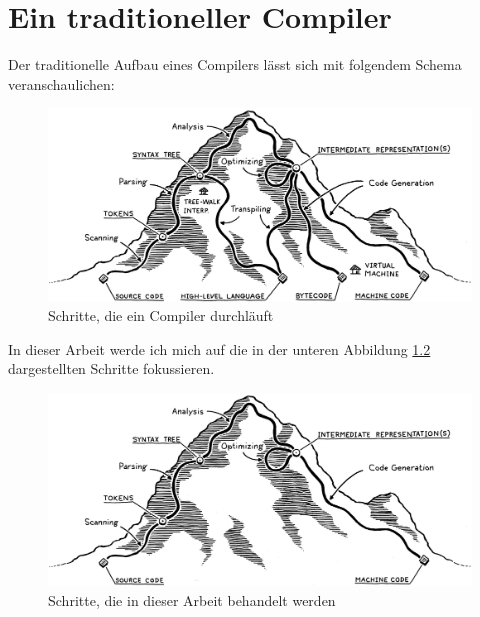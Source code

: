 \chapter{Ein traditioneller Compiler} \label{cha:3-Tradional_Compiler}

Der traditionelle Aufbau eines Compilers lässt sich mit folgendem Schema veranschaulichen:

\begin{figure}[h!]
    \centering
    \includegraphics[scale=0.2]{resources/images/mountain.png}
    \caption[Schritte, die ein Compiler durchläuft (https://github.com/munificent/craftinginterpreters, besucht am 5.8.2024)]{Schritte, die ein Compiler durchläuft}
    \label{fig:mountain}
\end{figure}

In dieser Arbeit werde ich mich auf die in der unteren Abbildung \ref{fig:mountain-edited} dargestellten Schritte fokussieren.

\begin{figure}[h!]
    \centering
    \includegraphics[scale=0.2]{resources/images/mountain-edited.png}
    \caption[Schritte, die in dieser Arbeit behandelt werden (Basierend auf Abbildung \ref{fig:mountain})]{Schritte, die in dieser Arbeit behandelt werden}
    \label{fig:mountain-edited}
\end{figure}

